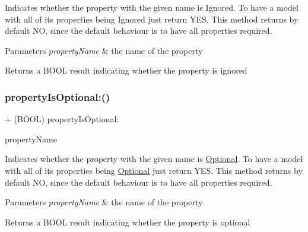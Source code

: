 Indicates whether the property with the given name is Ignored. To have a model with all of its properties being Ignored just return Y\+ES. This method returns by default NO, since the default behaviour is to have all properties required. 
\begin{DoxyParams}{Parameters}
{\em property\+Name} & the name of the property \\
\hline
\end{DoxyParams}
\begin{DoxyReturn}{Returns}
a B\+O\+OL result indicating whether the property is ignored 
\end{DoxyReturn}
\mbox{\label{interface_o_p_t_l_y_j_s_o_n_model_afaf77fcb6d2307217a858c764df3ae75}} 
\subsubsection{\texorpdfstring{property\+Is\+Optional\+:()}{propertyIsOptional:()}}
{\footnotesize\ttfamily + (B\+O\+OL) property\+Is\+Optional\+: \begin{DoxyParamCaption}\item[{(N\+S\+String $\ast$)}]{property\+Name }\end{DoxyParamCaption}}

Indicates whether the property with the given name is \mbox{\hyperlink{protocol_optional-p}{Optional}}. To have a model with all of its properties being \mbox{\hyperlink{protocol_optional-p}{Optional}} just return Y\+ES. This method returns by default NO, since the default behaviour is to have all properties required. 
\begin{DoxyParams}{Parameters}
{\em property\+Name} & the name of the property \\
\hline
\end{DoxyParams}
\begin{DoxyReturn}{Returns}
a B\+O\+OL result indicating whether the property is optional 
\end{DoxyReturn}
\mbox{\label{interface_o_p_t_l_y_j_s_o_n_model_a5b08f6a900e32f655981c0c2cbcca3f8}} 
